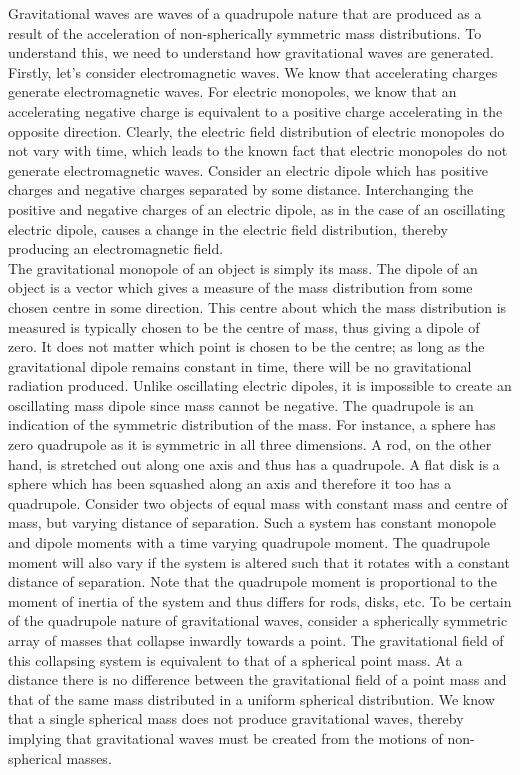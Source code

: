 \documentclass[12pt]{article}
\begin{document}
	Gravitational waves are waves of a quadrupole nature that are produced as a result of the acceleration of non-spherically symmetric mass distributions. To understand this, we need to understand how gravitational waves are generated. Firstly, let’s consider electromagnetic waves. We know that accelerating charges generate electromagnetic waves. For electric monopoles, we know that an accelerating negative charge is equivalent to a positive charge accelerating in the opposite direction. Clearly, the electric field distribution of electric monopoles do not vary with time, which leads to the known fact that electric monopoles do not generate electromagnetic waves. Consider an electric dipole which has positive charges and negative charges separated by some distance. Interchanging the positive and negative charges of an electric dipole, as in the case of an oscillating electric dipole, causes a change in the electric field distribution, thereby producing an electromagnetic field.\\ The gravitational monopole of an object is simply its mass. The dipole of an object is a vector which gives a measure of the mass distribution from some chosen centre in some direction. This centre about which the mass distribution is measured is typically chosen to be the centre of mass, thus giving a dipole of zero. It does not matter which point is chosen to be the centre; as long as the gravitational dipole remains constant in time, there will be no gravitational radiation produced. Unlike oscillating electric dipoles, it is impossible to create an oscillating mass dipole since mass cannot be negative. The quadrupole is an indication of the symmetric distribution of the mass. For instance, a sphere has zero quadrupole as it is symmetric in all three dimensions. A rod, on the other hand, is stretched out along one axis and thus has a quadrupole. A flat disk is a sphere which has been squashed along an axis and therefore it too has a quadrupole. Consider two objects of equal mass with constant mass and centre of mass, but varying distance of separation. Such a system has constant monopole and dipole moments with a time varying quadrupole moment. The quadrupole moment will also vary if the system is altered such that it rotates with a constant distance of separation. Note that the quadrupole moment is proportional to the moment of inertia of the system and thus differs for rods, disks, etc. To be certain of the quadrupole nature of gravitational waves, consider a spherically symmetric array of masses that collapse inwardly towards a point. The gravitational field of this collapsing system is equivalent to that of a spherical point mass. At a distance there is no difference between the gravitational field of a point mass and that of the same mass distributed in a uniform spherical distribution. We know that a single spherical mass does not produce gravitational waves, thereby implying that gravitational waves must be created from the motions of non-spherical masses.
\end{document}
